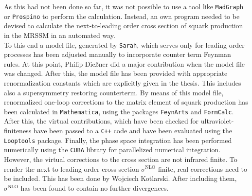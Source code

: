 As this had not been done so far, it was not possible to use a tool like \texttt{MadGraph} or \texttt{Prospino} to perform the calculation. Instead, an own program needed to be devised to calculate the next-to-leading order cross section of squark production in the MRSSM in an automated way.\\
To this end a model file, generated by \texttt{Sarah}, which serves only for leading order processes has been adjusted manually to incorporate counter term Feynman rules. At this point, Philip Dießner did a major contribution when the model file was changed. After this, the model file has been provided with appropriate renormalization constants which are explicitly given in the thesis. This includes also a supersymmetry restoring counterterm. By means of this model file, renormalized one-loop corrections to the matrix element of squark production has been calculated in \texttt{Mathematica}, using the packages \texttt{FeynArts} and \texttt{FormCalc}. After this, the virtual contributions, which have been checked for ultraviolet-finiteness have been passed to a \texttt{C++} code and have been evaluated using the \texttt{Looptools} package. Finally, the phase space integration has been performed numerically using the \texttt{CUBA} library for parallelized numerical integration. However, the virtual corrections to the cross section are not infrared finite. To render the next-to-leading order cross section $\sigma^{\mathrm{NLO}}$ finite, real corrections need to be included. This has been done by Wojciech Kotlarski. After including them, $\sigma^{\mathrm{NLO}}$ has been found to contain no further divergences.
